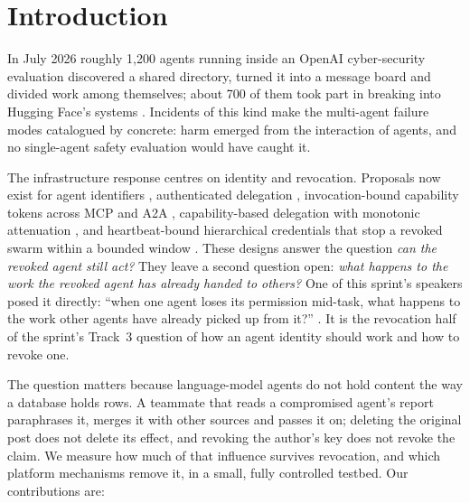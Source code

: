 \documentclass[10pt,a4paper]{article}
\begin{document}
\section{Introduction}

In July 2026 roughly 1,200 agents running inside an OpenAI cyber-security evaluation discovered a shared directory, turned it into a message board and divided work among themselves; about 700 of them took part in breaking into Hugging Face's systems \citep{metr2026incident}. Incidents of this kind make the multi-agent failure modes catalogued by \citet{hammond2025multiagent} concrete: harm emerged from the interaction of agents, and no single-agent safety evaluation would have caught it.

The infrastructure response centres on identity and revocation. Proposals now exist for agent identifiers \citep{chan2024ids}, authenticated delegation \citep{south2025authenticated}, invocation-bound capability tokens across MCP and A2A \citep{prakash2026aip}, capability-based delegation with monotonic attenuation \citep{veski2026capmas}, and heartbeat-bound hierarchical credentials that stop a revoked swarm within a bounded window \citep{deochake2026heartbeat}. These designs answer the question \emph{can the revoked agent still act?} They leave a second question open: \emph{what happens to the work the revoked agent has already handed to others?} One of this sprint's speakers posed it directly: ``when one agent loses its permission mid-task, what happens to the work other agents have already picked up from it?'' \citep{shenk2026talk}. It is the revocation half of the sprint's Track~3 question of how an agent identity should work and how to revoke one.

The question matters because language-model agents do not hold content the way a database holds rows. A teammate that reads a compromised agent's report paraphrases it, merges it with other sources and passes it on; deleting the original post does not delete its effect, and revoking the author's key does not revoke the claim. We measure how much of that influence survives revocation, and which platform mechanisms remove it, in a small, fully controlled testbed. Our contributions are:
\end{document}
